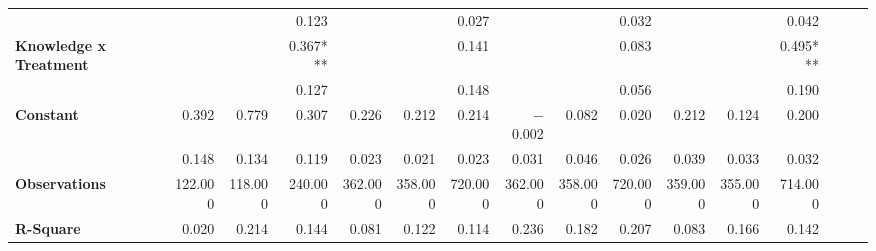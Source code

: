 \begin{tabular}{@{\extracolsep{5pt}}lrrrrrrrrrrrrrrr}
{\bf } & \phantom{***} & \phantom{***} & 0.123\phantom{\phantom{)}***} & \phantom{***} & \phantom{***} & 0.027\phantom{\phantom{)}***} & \phantom{***} & \phantom{***} & 0.032\phantom{\phantom{)}***} & \phantom{***} & \phantom{***} & 0.042\phantom{\phantom{)}***} \\
{\bf Knowledge x Treatment} & \phantom{***} & \phantom{***} & 0.367\phantom{)}*** & \phantom{***} & \phantom{***} & 0.141\phantom{\phantom{)}***} & \phantom{***} & \phantom{***} & 0.083\phantom{\phantom{)}***} & \phantom{***} & \phantom{***} & 0.495\phantom{)}*** \\
{\bf } & \phantom{***} & \phantom{***} & 0.127\phantom{\phantom{)}***} & \phantom{***} & \phantom{***} & 0.148\phantom{\phantom{)}***} & \phantom{***} & \phantom{***} & 0.056\phantom{\phantom{)}***} & \phantom{***} & \phantom{***} & 0.190\phantom{\phantom{)}***} \\
{\bf Constant} & 0.392\phantom{\phantom{)}***} & 0.779\phantom{\phantom{)}***} & 0.307\phantom{\phantom{)}***} & 0.226\phantom{\phantom{)}***} & 0.212\phantom{\phantom{)}***} & 0.214\phantom{\phantom{)}***} & $-$0.002\phantom{\phantom{)}***} & 0.082\phantom{\phantom{)}***} & 0.020\phantom{\phantom{)}***} & 0.212\phantom{\phantom{)}***} & 0.124\phantom{\phantom{)}***} & 0.200\phantom{\phantom{)}***} \\
{\bf } & 0.148\phantom{\phantom{)}***} & 0.134\phantom{\phantom{)}***} & 0.119\phantom{\phantom{)}***} & 0.023\phantom{\phantom{)}***} & 0.021\phantom{\phantom{)}***} & 0.023\phantom{\phantom{)}***} & 0.031\phantom{\phantom{)}***} & 0.046\phantom{\phantom{)}***} & 0.026\phantom{\phantom{)}***} & 0.039\phantom{\phantom{)}***} & 0.033\phantom{\phantom{)}***} & 0.032\phantom{\phantom{)}***} \\
{\bf Observations} & 122.000\phantom{\phantom{)}***} & 118.000\phantom{\phantom{)}***} & 240.000\phantom{\phantom{)}***} & 362.000\phantom{\phantom{)}***} & 358.000\phantom{\phantom{)}***} & 720.000\phantom{\phantom{)}***} & 362.000\phantom{\phantom{)}***} & 358.000\phantom{\phantom{)}***} & 720.000\phantom{\phantom{)}***} & 359.000\phantom{\phantom{)}***} & 355.000\phantom{\phantom{)}***} & 714.000\phantom{\phantom{)}***} \\
{\bf R-Square} & 0.020\phantom{***} & 0.214\phantom{***} & 0.144\phantom{***} & 0.081\phantom{***} & 0.122\phantom{***} & 0.114\phantom{***} & 0.236\phantom{***} & 0.182\phantom{***} & 0.207\phantom{***} & 0.083\phantom{***} & 0.166\phantom{***} & 0.142\phantom{***} \\
\hline
\end{tabular}
